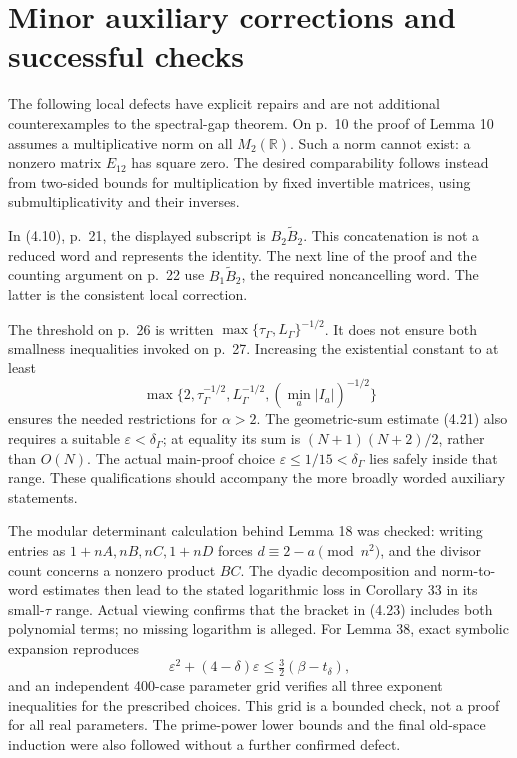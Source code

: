 \documentclass[10pt]{article}
\begin{document}
\section*{Minor auxiliary corrections and successful checks}
The following local defects have explicit repairs and are not additional counterexamples to the spectral-gap theorem. On p. 10 the proof of Lemma 10 assumes a multiplicative norm on all \(M_2(\mathbb R)\). Such a norm cannot exist: a nonzero matrix \(E_{12}\) has square zero. The desired comparability follows instead from two-sided bounds for multiplication by fixed invertible matrices, using submultiplicativity and their inverses.\par
In (4.10), p. 21, the displayed subscript is \(B_2\widetilde B_2\). This concatenation is not a reduced word and represents the identity. The next line of the proof and the counting argument on p. 22 use \(B_1\widetilde B_2\), the required noncancelling word. The latter is the consistent local correction.\par
The threshold on p. 26 is written \(\max\{\tau_\Gamma,L_\Gamma\}^{-1/2}\). It does not ensure both smallness inequalities invoked on p. 27. Increasing the existential constant to at least \[\max\{2,\tau_\Gamma^{-1/2},L_\Gamma^{-1/2},
                (\min_a|I_a|)^{-1/2}\}\] ensures the needed restrictions for \(\alpha>2\). The geometric-sum estimate (4.21) also requires a suitable \(\varepsilon<\delta_\Gamma\); at equality its sum is \((N+1)(N+2)/2\), rather than \(O(N)\). The actual main-proof choice \(\varepsilon\le1/15<\delta_\Gamma\) lies safely inside that range. These qualifications should accompany the more broadly worded auxiliary statements.\par
The modular determinant calculation behind Lemma 18 was checked: writing entries as \(1+nA,nB,nC,1+nD\) forces \(d\equiv2-a\pmod{n^2}\), and the divisor count concerns a nonzero product \(BC\). The dyadic decomposition and norm-to-word estimates then lead to the stated logarithmic loss in Corollary 33 in its small-\(\tau\) range. Actual viewing confirms that the bracket in (4.23) includes both polynomial terms; no missing logarithm is alleged. For Lemma 38, exact symbolic expansion reproduces \[\varepsilon^2+(4-\delta)\varepsilon
       \le \tfrac32(\beta-t_\delta),\] and an independent 400-case parameter grid verifies all three exponent inequalities for the prescribed choices. This grid is a bounded check, not a proof for all real parameters. The prime-power lower bounds and the final old-space induction were also followed without a further confirmed defect.\par
\end{document}
